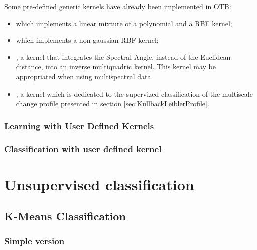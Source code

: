 Some pre-defined generic kernels have already been implemented in OTB:
\begin{itemize}
\item {} which implements a 
linear mixture
of a polynomial and a RBF kernel;
\item {} which implements a non
gaussian RBF kernel;
\item {}, a kernel that integrates
the Spectral Angle, instead of the Euclidean distance, into an inverse 
multiquadric kernel.
This kernel may be appropriated when using multispectral data.
\item {}, a kernel which is
dedicated to the supervized classification of the multiscale change profile
presented in section \ref{sec:KullbackLeiblerProfile}.
\end{itemize}

\subsubsection{Learning with User Defined Kernels}
\label{sec:Learningwithuserdefinedkernel}
\ifitkFullVersion

\fi

\subsubsection{Classification with user defined kernel}

\ifitkFullVersion

\fi


\section{Unsupervised classification}

\subsection{K-Means Classification}
\label{sec:KMeansClassifier}

\subsubsection{Simple version}
\ifitkFullVersion

\fi
\ifitkFullVersion

\fi

